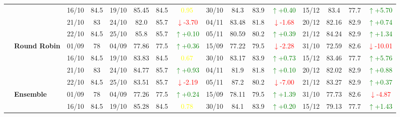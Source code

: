 \documentclass{ieeeaccess}
\begin{document}
{\begin{longtable}{llcc|cccc|cccc|cccc}
&
& 16/10 & 84.5 & 19/10 & 85.45 & 84.5 & \textcolor{yellow}{0.95} & 30/10 & 84.3 & 83.9 & \textcolor{green}{\(\uparrow\)+0.40} & 15/12 & 83.4 & 77.7 & \textcolor{green}{\(\uparrow\)+5.70} \\

&
& 21/10 & 83 & 24/10 & 82.0 & 85.7 & \textcolor{red}{\(\downarrow\)-3.70} & 04/11 & 83.48 & 81.8 & \textcolor{red}{\(\downarrow\)-1.68} & 20/12 & 82.16 & 82.9 & \textcolor{green}{\(\uparrow\)+0.74} \\

&
& 22/10 & 84.5 & 25/10 & 85.8 & 85.7 & \textcolor{green}{\(\uparrow\)+0.10} & 05/11 & 80.59 & 80.2 & \textcolor{green}{\(\uparrow\)+0.39} & 21/12 & 84.24 & 82.9 & \textcolor{green}{\(\uparrow\)+1.34} \\
\cmidrule(lr){2-16}


& \textbf{Round Robin}
& 01/09 & 78 & 04/09 & 77.86 & 77.5 & \textcolor{green}{\(\uparrow\)+0.36} & 15/09 & 77.22 & 79.5 & \textcolor{red}{\(\downarrow\)-2.28} & 31/10 & 72.59 & 82.6 & \textcolor{red}{\(\downarrow\)-10.01} \\

&
& 16/10 & 84.5 & 19/10 & 83.83 & 84.5 & \textcolor{yellow}{0.67} & 30/10 & 83.17 & 83.9 & \textcolor{green}{\(\uparrow\)+0.73} & 15/12 & 83.46 & 77.7 & \textcolor{green}{\(\uparrow\)+5.76} \\

&
& 21/10 & 83 & 24/10 & 84.77 & 85.7 & \textcolor{green}{\(\uparrow\)+0.93} & 04/11 & 81.9 & 81.8 & \textcolor{green}{\(\uparrow\)+0.10} & 20/12 & 82.02 & 82.9 & \textcolor{green}{\(\uparrow\)+0.88} \\

&
& 22/10 & 84.5 & 25/10 & 83.51 & 85.7 & \textcolor{red}{\(\downarrow\)-2.19} & 05/11 & 87.2 & 80.2 & \textcolor{red}{\(\downarrow\)-7.00} & 21/12 & 83.27 & 82.9 & \textcolor{green}{\(\uparrow\)+0.37} \\
\cmidrule(lr){2-16}




& \textbf{Ensemble}
& 01/09 & 78 & 04/09 & 77.26 & 77.5 & \textcolor{green}{\(\uparrow\)+0.24} & 15/09 & 78.11 & 79.5 & \textcolor{green}{\(\uparrow\)+1.39} & 31/10 & 77.73 & 82.6 & \textcolor{red}{\(\downarrow\)-4.87} \\

&
& 16/10 & 84.5 & 19/10 & 85.28 & 84.5 & \textcolor{yellow}{0.78} & 30/10 & 84.1 & 83.9 & \textcolor{green}{\(\uparrow\)+0.20} & 15/12 & 79.13 & 77.7 & \textcolor{green}{\(\uparrow\)+1.43} \\


\end{longtable}}
\end{document}
